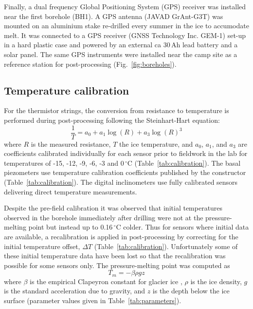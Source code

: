\documentclass[utf8]{article}
\begin{document}
    Finally, a dual frequency Global Positioning System (GPS) receiver was
    installed near the first borehole (BH1). A GPS antenna (JAVAD GrAnt-G3T)
    was mounted on an aluminium stake re-drilled every summer in the
    ice to accumodate melt. It was connected to a GPS receiver (GNSS Technology
    Inc. GEM-1) set-up in a hard plastic case and powered by an external ca
    30\,Ah lead battery and a solar panel. The same GPS instruments were
    installed near the camp site as a reference station for post-processing
    (Fig.~\ref{fig:boreholes}).


\subsection{Temperature calibration}


    For the thermistor strings, the conversion from resistance to temperature
    is performed during post-processing following the Steinhart-Hart equation:
    \begin{equation}
      \frac{1}{T} = a_0 + a_1 \log(R) + a_3 \log(R)^3
    \end{equation}
    where $R$ is the measured resistance, $T$ the ice temperature, and $a_0$,
    $a_1$, and $a_3$ are coefficients calibrated individually for each sensor
    prior to fieldwork in the lab for temperatures of -15, -12, -9, -6, -3 and
    0\,$^\circ$C (Table~\ref{tab:calibration}). The basal piezometers use
    temperature calibration coefficients published by the constructor
    (Table~\ref{tab:calibration}). The digital inclinometers use fully
    calibrated sensors delivering direct temperature measurements.

    Despite the pre-field calibration it was observed that initial temperatures
    observed in the borehole immediately after drilling were not at the
    pressure-melting point but instead up to 0.16\,$^\circ$C colder.  Thus for
    sensors where initial data are available, a recalibration is applied in
    post-processing by correcting for the initial temperature offset, $\Delta
    T$ (Table~\ref{tab:calibration}). Unfortunately some of these initial
    temperature data have been lost so that the recalibration was possible for
    some sensors only. The pressure-melting point was computed as
    \begin{equation}
      T_m = -\beta \rho g z
    \end{equation}
    where $\beta$ is the empirical Clapeyron constant for glacier ice
    \citep{Luthi.etal.2002}, $\rho$ is the ice density, $g$ is the standard
    acceleration due to gravity, and $z$ is the depth below the ice surface
    (parameter values given in Table~\ref{tab:parameters}).
\end{document}
